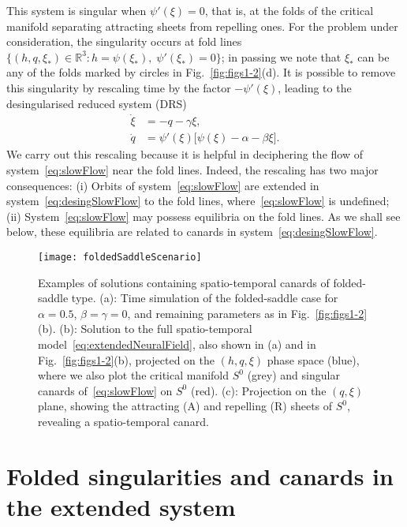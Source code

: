 \documentclass[aps,prl,reprint,superscriptaddress]{revtex4-1}
\newcommand{\RSet}{\mathbb{R}}
\newcommand{\edits}[1]{#1}
\begin{document}
This system is singular when $\psi'(\xi) = 0$, that is, at the folds of the critical
manifold separating attracting sheets from repelling ones. For the problem under
consideration, the singularity occurs at fold lines $\{ (h, q, \xi_*) \in \RSet^3
\colon h = \psi(\xi_*),\; \psi'(\xi_*) = 0\}$; in passing we note that $\xi_*$ can be
any of the folds marked by circles in Fig.~\ref{fig:figs1-2}(d).
%
It is possible to remove this singularity by rescaling time by the factor
$-\psi'(\xi)$, leading to the desingularised reduced system (DRS)
\begin{equation}\label{eq:desingSlowFlow}
\begin{aligned}
  \dot \xi & =  -q - \gamma \xi,\\
  \dot q & = \psi'(\xi) \big[ \psi(\xi) - \alpha -\beta \xi\big].
\end{aligned}
\end{equation}
%
We carry out this rescaling because it is helpful in deciphering the flow of
system~\eqref{eq:slowFlow} near the fold lines. Indeed, the rescaling has two major
consequences: (i) Orbits of system~\eqref{eq:slowFlow} are extended in
system~\eqref{eq:desingSlowFlow} to the fold lines, where~\eqref{eq:slowFlow} is
undefined; (ii) System~\eqref{eq:slowFlow} may possess equilibria on the fold lines.
As we shall see below, these equilibria are related to canards in
system~\eqref{eq:desingSlowFlow}.

%
\begin{figure*}
    \texttt{[image: foldedSaddleScenario]}
    \caption{Examples of solutions containing spatio-temporal canards of
    folded-saddle type. (a): Time simulation of the folded-saddle case for
    $\alpha=0.5$, $\beta=\gamma=0$, and remaining parameters as in
    Fig.~\ref{fig:figs1-2}(b). (b): Solution to the full spatio-temporal
    model~\eqref{eq:extendedNeuralField}, also shown in (a) and in
    Fig.~\ref{fig:figs1-2}(b), projected on the \edits{$(h,q,\xi)$} phase space (blue), where
    we also plot the critical manifold $S^0$ (grey) and singular canards
    of~\eqref{eq:slowFlow} on $S^0$ (red). (c): Projection on the \edits{$(q,\xi)$} plane,
    showing the attracting (A) and repelling (R) sheets of $S^0$, revealing a
    spatio-temporal canard.}
    \label{fig:foldedSingCanards}
\end{figure*}

\section{Folded singularities and canards in the extended system} \label{sec:canards}
\end{document}
